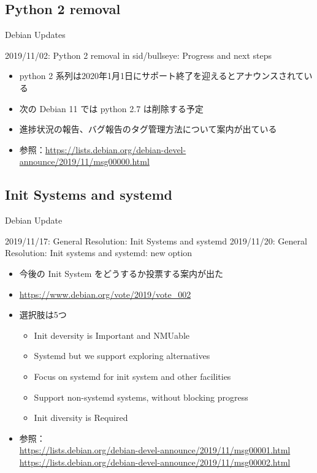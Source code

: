 \subsection{Python 2 removal}

\begin{frame}{Debian Updates}%

2019/11/02: Python 2 removal in sid/bullseye: Progress and next steps
  
\begin{itemize}
\item python 2 系列は2020年1月1日にサポート終了を迎えるとアナウンスされている
\item 次の Debian 11 では python 2.7 は削除する予定
\item 進捗状況の報告、バグ報告のタグ管理方法について案内が出ている
\item 参照：\url{https://lists.debian.org/debian-devel-announce/2019/11/msg00000.html}
\end{itemize}

\end{frame}


\subsection{Init Systems and systemd}

\begin{frame}{Debian Update}%

2019/11/17: General Resolution: Init Systems and systemd
2019/11/20: General Resolution: Init systems and systemd: new option

\begin{itemize}
\item 今後の Init System をどうするか投票する案内が出た
\item \url{https://www.debian.org/vote/2019/vote_002}
\item 選択肢は5つ
  \begin{itemize}
  \item Init deversity is Important and NMUable
  \item Systemd but we support exploring alternatives
  \item Focus on systemd for init system and other facilities
  \item Support non-systemd systems, without blocking progress
  \item Init diversity is Required
  \end{itemize}
\item 参照：\\
  \url{https://lists.debian.org/debian-devel-announce/2019/11/msg00001.html} \\
  \url{https://lists.debian.org/debian-devel-announce/2019/11/msg00002.html}
\end{itemize}

\end{frame}



